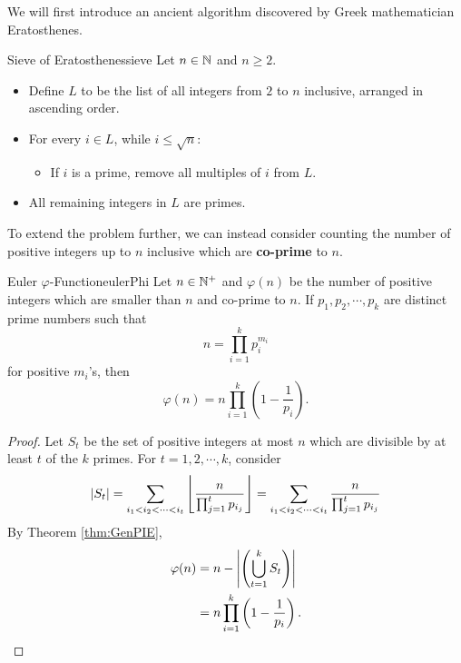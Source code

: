\documentclass[math]{amznotes}
\theoremstyle{remark}
\begin{document}
We will first introduce an ancient algorithm discovered by Greek mathematician Eratosthenes.
\begin{tecbox}{Sieve of Eratosthenes}{sieve}
    Let $n \in \mathbb{N}$ and $n \geq 2$.
    \begin{itemize}
        \item Define $L$ to be the list of all integers from $2$ to $n$ inclusive, arranged in ascending order.
        \item For every $i \in L$, while $i \leq \sqrt{n}$:
        \begin{itemize}
            \item If $i$ is a prime, remove all multiples of $i$ from $L$.
        \end{itemize}
        \item All remaining integers in $L$ are primes.
    \end{itemize}
\end{tecbox}
To extend the problem further, we can instead consider counting the number of positive integers up to $n$ inclusive which are \textbf{co-prime} to $n$.
\begin{thmbox}{Euler $\varphi$-Function}{eulerPhi}
    Let $n \in \mathbb{N}^+$ and $\varphi(n)$ be the number of positive integers which are smaller than $n$ and co-prime to $n$. If $p_1, p_2, \cdots, p_k$ are distinct prime numbers such that
    \begin{equation*}
        n = \prod_{i = 1}^{k}p_i^{m_i}
    \end{equation*} 
    for positive $m_i$'s, then
    \begin{equation*}
        \varphi(n) = n\prod_{i = 1}^{k}\left(1 - \frac{1}{p_i}\right).
    \end{equation*}
    \tcblower
    \begin{proof}
        Let $S_t$ be the set of positive integers at most $n$ which are divisible by at least $t$ of the $k$ primes. For $t = 1, 2, \cdots, k$, consider
        \begin{equation*}
            {\left\lvert {S_t} \right\rvert} = \sum_{i_1 < i_2 < \cdots < i_t}\left\lfloor\frac{n}{\prod_{j = 1}^{t}p_{i_j}}\right\rfloor = \sum_{i_1 < i_2 < \cdots < i_t}\frac{n}{\prod_{j = 1}^{t}p_{i_j}}
        \end{equation*}
        By Theorem \ref{thm:GenPIE},
        \begin{align*}
            \varphi(n) & = n - {\left\lvert {\left(\bigcup_{t = 1}^{k}S_t\right)} \right\rvert} \\
            & = n\prod_{i = 1}^{k}\left(1 - \frac{1}{p_i}\right).
        \end{align*}
    \end{proof}
\end{thmbox}
\end{document}
